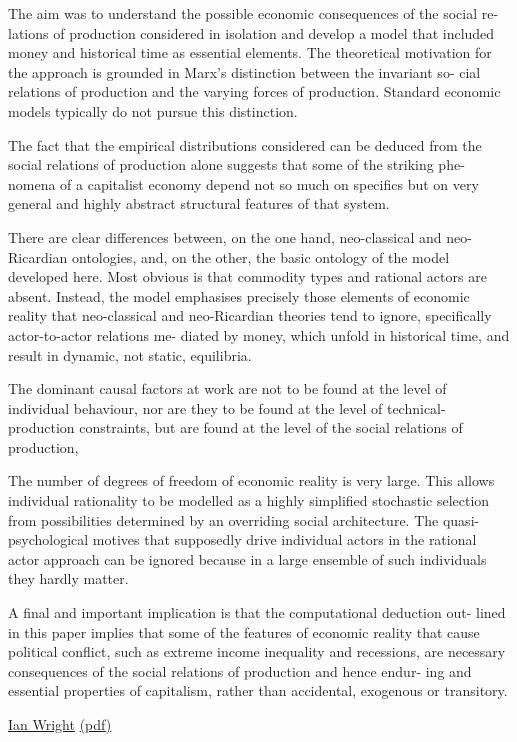 \documentclass[
]{book}
\begin{document}
The aim was to understand the possible economic consequences of the social re-
lations of production considered in isolation and develop a model that included
money and historical time as essential elements. The theoretical motivation
for the approach is grounded in Marx's distinction between the invariant so-
cial relations of production and the varying forces of production. Standard
economic models typically do not pursue this distinction.

The fact that the empirical distributions considered can be deduced from the
social relations of production alone suggests that some of the striking phe-
nomena of a capitalist economy depend not so much on specifics but on very
general and highly abstract structural features of that system.

There are clear differences
between, on the one hand, neo-classical and neo-Ricardian ontologies, and,
on the other, the basic ontology of the model developed here. Most obvious
is that commodity types and rational actors are absent. Instead, the model
emphasises precisely those elements of economic reality that neo-classical and
neo-Ricardian theories tend to ignore, specifically actor-to-actor relations me-
diated by money, which unfold in historical time, and result in dynamic, not
static, equilibria.

The dominant causal
factors at work are not to be found at the level of individual behaviour, nor are
they to be found at the level of technical-production constraints, but are found
at the level of the social relations of production,

The
number of degrees of freedom of economic reality is very large. This allows
individual rationality to be modelled as a highly simplified stochastic selection
from possibilities determined by an overriding social architecture. The quasi-
psychological motives that supposedly drive individual actors in the rational
actor approach can be ignored because in a large ensemble of such individuals
they hardly matter.

A final and important implication is that the computational deduction out-
lined in this paper implies that some of the features of economic reality that
cause political conflict, such as extreme income inequality and recessions, are
necessary consequences of the social relations of production and hence endur-
ing and essential properties of capitalism, rather than accidental, exogenous
or transitory.

\href{https://ianwrightsite.wordpress.com/2017/11/16/the-social-architecture-of-capitalism/}{Ian Wright}
\href{pdf/Ian_Wright_2005-Social_Architecture_of_Capitalism.pdf}{(pdf)}
\end{document}
